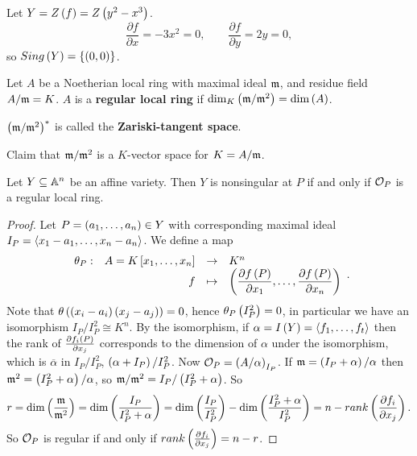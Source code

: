 \begin{example}
Let $ Y = Z\left( f \right) = Z\left( y^2 - x^3 \right) $.
$$ \dfrac{\partial f}{\partial x} = -3x^2 = 0, \qquad \dfrac{\partial f}{\partial y} = 2y = 0, $$
so $ Sing\left( Y \right) = \left\{ \left( 0, 0 \right) \right\} $.
\end{example}

\begin{definition}
Let $ A $ be a Noetherian local ring with maximal ideal $ \mathfrak{m} $, and residue field $ A / \mathfrak{m} = K $. $ A $ is a \textbf{regular local ring} if $ \dim_K\left( \mathfrak{m} / \mathfrak{m}^2 \right) = \dim\left( A \right) $.
\end{definition}

\begin{note*}
$ \left( \mathfrak{m} / \mathfrak{m}^2 \right)^* $ is called the \textbf{Zariski-tangent space}.
\end{note*}

Claim that $ \mathfrak{m} / \mathfrak{m}^2 $ is a $ K $-vector space for $ K = A / \mathfrak{m} $.

\begin{theorem}
Let $ Y \subseteq \mathbb{A}^n $ be an affine variety. Then $ Y $ is nonsingular at $ P $ if and only if $ \mathcal{O}_P $ is a regular local ring.
\end{theorem}

\begin{proof}
Let $ P = \left( a_1, \dots, a_n \right) \in Y $ with corresponding maximal ideal $ I_P = \left\langle x_1 - a_1, \dots, x_n - a_n \right\rangle $. We define a map
$$ \function[\theta_P]{A = K\sb{x_1, \dots, x_n}}{K^n}{f}{\rb{\dfrac{\partial f\rb{P}}{\partial x_1}, \dots, \dfrac{\partial f\rb{P}}{\partial x_n}}}. $$
Note that $ \theta\left( \left( x_i - a_i \right)\left( x_j - a_j \right) \right) = 0 $, hence $ \theta_P\left( I_P^2 \right) = 0 $, in particular we have an isomorphism $ I_P / I_P^2 \cong K^n $. By the isomorphism, if $ \alpha = I\left( Y \right) = \left\langle f_1, \dots, f_t \right\rangle $ then the rank of $ \tfrac{\partial f_i\left( P \right)}{\partial x_j} $ corresponds to the dimension of $ \alpha $ under the isomorphism, which is $ \overline{\alpha} $ in $ I_P / I_P^2 $, $ \left( \alpha + I_P \right) / I_P^2 $. Now $ \mathcal{O}_P = \left( A / \alpha \right)_{I_P} $. If $ \mathfrak{m} = \left( I_P + \alpha \right) / \alpha $ then $ \mathfrak{m}^2 = \left( I_P^2 + \alpha \right) / \alpha $, so $ \mathfrak{m} / \mathfrak{m}^2 = I_P / \left( I_P^2 + \alpha \right) $. So
$$ r = \dim\left( \dfrac{\mathfrak{m}}{\mathfrak{m}^2} \right) = \dim\left( \dfrac{I_P}{I_P^2 + \alpha} \right) = \dim\left( \dfrac{I_P}{I_P^2} \right) - \dim\left( \dfrac{I_P^2 + \alpha}{I_P^2} \right) = n - rank\left( \dfrac{\partial f_i}{\partial x_j} \right). $$
So $ \mathcal{O}_P $ is regular if and only if $ rank\left( \tfrac{\partial f_i}{\partial x_j} \right) = n - r $.
\end{proof}

